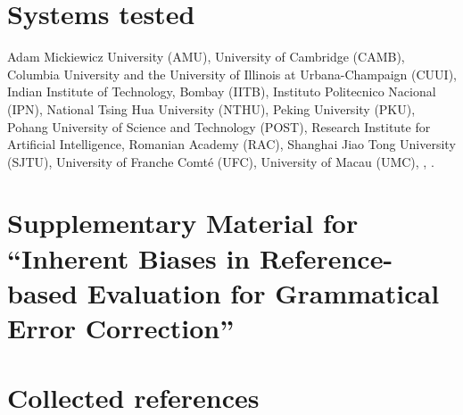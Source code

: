 \documentclass[letterpaper, 11pt]{article}
\begin{document}
\appendix

\title{}

\onecolumn


\section{Systems tested}\label{ap:abbr}
Adam Mickiewicz University (AMU),
University of Cambridge (CAMB), Columbia University and the University of Illinois at Urbana-Champaign (CUUI),
Indian Institute of Technology, Bombay (IITB), Instituto Politecnico Nacional (IPN),
National Tsing Hua University (NTHU), Peking University (PKU), Pohang University of Science and Technology (POST),
Research Institute for Artificial Intelligence, Romanian Academy (RAC), Shanghai Jiao Tong University (SJTU),
University of Franche Comt\'{e} (UFC), University of Macau (UMC), ,  .

\section*{\centering\Large Supplementary Material for ``Inherent Biases in Reference-based Evaluation for
Grammatical Error Correction''}


\section{Collected references}\label{ap:crowd}
\end{document}
